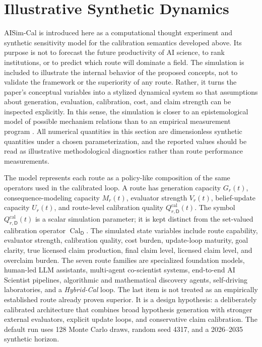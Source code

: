 \documentclass[11pt,a4paper]{article}
\newcommand{\Cal}{\operatorname{Cal}}
\newcommand{\Dom}{\mathsf{D}}
\begin{document}
\section{Illustrative Synthetic Dynamics}

AISim-Cal is introduced here as a computational thought experiment and synthetic sensitivity model for the calibration semantics developed above. Its purpose is not to forecast the future productivity of AI science, to rank institutions, or to predict which route will dominate a field. The simulation is included to illustrate the internal behavior of the proposed concepts, not to validate the framework or the superiority of any route. Rather, it turns the paper's conceptual variables into a stylized dynamical system so that assumptions about generation, evaluation, calibration, cost, and claim strength can be inspected explicitly. In this sense, the simulation is closer to an epistemological model of possible mechanism relations than to an empirical measurement program \citep{Winsberg2010Simulation}. All numerical quantities in this section are dimensionless synthetic quantities under a chosen parameterization, and the reported values should be read as illustrative methodological diagnostics rather than route performance measurements.

The model represents each route as a policy-like composition of the same operators used in the calibrated loop. A route has generation capacity $G_r(t)$, consequence-modeling capacity $M_r(t)$, evaluator strength $V_r(t)$, belief-update capacity $U_r(t)$, and route-level calibration quality $Q^{\mathrm{cal}}_{r,\Dom}(t)$. The symbol $Q^{\mathrm{cal}}_{r,\Dom}(t)$ is a scalar simulation parameter; it is kept distinct from the set-valued calibration operator $\Cal_{\Dom}$. The simulated state variables include route capability, evaluator strength, calibration quality, cost burden, update-loop maturity, goal clarity, true licensed claim production, final claim level, licensed claim level, and overclaim burden. The seven route families are specialized foundation models, human-led LLM assistants, multi-agent co-scientist systems, end-to-end AI Scientist pipelines, algorithmic and mathematical discovery agents, self-driving laboratories, and a \emph{Hybrid-Cal} loop. The last item is not treated as an empirically established route already proven superior. It is a design hypothesis: a deliberately calibrated architecture that combines broad hypothesis generation with stronger external evaluators, explicit update loops, and conservative claim calibration. The default run uses 128 Monte Carlo draws, random seed 4317, and a 2026--2035 synthetic horizon.
\end{document}
